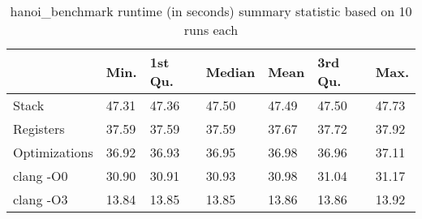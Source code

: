 \begin{table}[h!]
\centering
\begin{tabular}{p{}p{}p{}p{}p{}p{}p{}}
  \hline
 & Min. & 1st Qu. & Median & Mean & 3rd Qu. & Max. \\ 
  \hline
Stack & 47.31 & 47.36 & 47.50 & 47.49 & 47.50 & 47.73 \\ 
  Registers & 37.59 & 37.59 & 37.59 & 37.67 & 37.72 & 37.92 \\ 
  Optimizations & 36.92 & 36.93 & 36.95 & 36.98 & 36.96 & 37.11 \\ 
  clang -O0 & 30.90 & 30.91 & 30.93 & 30.98 & 31.04 & 31.17 \\ 
  clang -O3 & 13.84 & 13.85 & 13.85 & 13.86 & 13.86 & 13.92 \\ 
   \hline
\end{tabular}
\caption{hanoi\_benchmark runtime (in seconds) summary statistic based on 10 runs each}
\end{table}
